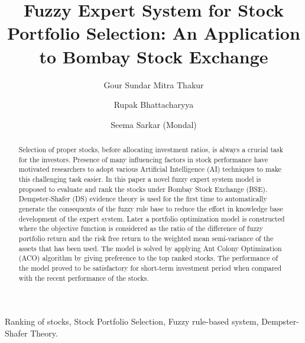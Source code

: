 \documentclass{elsarticle}
\begin{document}
\begin{abstract}
Selection of proper stocks, before allocating investment ratios, is always a crucial task for the investors. Presence 
of many influencing factors in stock performance have motivated researchers to adopt various Artificial Intelligence 
(AI) techniques to make this challenging task easier. In this paper a novel fuzzy expert system model is proposed to 
evaluate and rank the stocks under Bombay Stock Exchange (BSE). Dempster-Shafer (DS) evidence theory is used for 
the first time to automatically generate the consequents of the fuzzy rule base to reduce the effort in knowledge base 
development of the expert system. Later a portfolio optimization model is constructed where the objective function is 
considered as the ratio of the difference of fuzzy portfolio return and the risk free return to the weighted mean 
semi-variance of the assets that has been used. The model is solved by applying Ant Colony Optimization (ACO) algorithm 
by giving preference to the top ranked stocks. The performance of the model proved to be satisfactory for short-term 
investment period when compared with the recent performance of the stocks.            
 
\end{abstract}
\begin{keyword}
Ranking of stocks, Stock Portfolio Selection, Fuzzy rule-based system, Dempster-Shafer Theory.
\end{keyword}

\begin{frontmatter}
\title{Fuzzy Expert System for Stock Portfolio Selection: An Application to Bombay Stock Exchange}

\author[gsmt]{Gour Sundar Mitra Thakur}
\address[gsmt]{Department of Computer Science and Engineering, Dr. B. C. Roy Engg. College, Durgapur, West Bengal, India}

\author[rb]{Rupak Bhattacharyya}
\address[rb]{Department of Mathematics,Bijoy Krishna Girls' College, Howrah, West Bengal, India}


\author[sm]{Seema Sarkar (Mondal)}
\address[sm]{Department of Mathematics, National Institute of Technology Durgapur, West Bengal, India}
\end{frontmatter}

\let\Oldsection\section
\renewcommand{\section}{\FloatBarrier\Oldsection}
\end{document}
